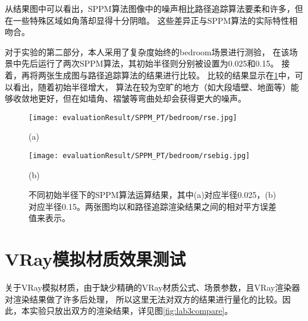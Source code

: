 从结果图中可以看出，SPPM算法图像中的噪声相比路径追踪算法要柔和许多，但在一些特殊区域如角落却显得十分阴暗。
这些差异正与SPPM算法的实际特性相吻合。

对于实验的第二部分，本人采用了复杂度始终的bedroom场景进行测验，
在该场景中先后运行了两次SPPM算法，其初始半径则分别被设置为0.025和0.15。
接着，再将两张生成图与路径追踪算法的结果进行比较。
比较的结果显示在\ref{fig:lab2compare}中，可以看出，随着初始半径增大，
算法在较为空旷的地方（如大段墙壁、地面等）能够收敛地更好，但在如墙角、褶皱等弯曲处却会获得更大的噪声。

\begin{figure}                 %
    \begin{minipage}{0.40\textwidth}  %
      \centerline{\texttt{[image: evaluationResult/SPPM\_PT/bedroom/rse.jpg]}}
      \centerline{(a)}
    \end{minipage}
    \hfill
    \begin{minipage}{0.40\textwidth}  %
      \centerline{\texttt{[image: evaluationResult/SPPM\_PT/bedroom/rsebig.jpg]}}
      \centerline{(b)}
    \end{minipage}    
    \caption{不同初始半径下的SPPM算法运算结果，其中(a)对应半径0.025，(b)对应半径0.15。两张图均以和路径追踪渲染结果之间的相对平方误差值来表示。}
    \label{fig:lab2compare}
\end{figure}

\section{VRay模拟材质效果测试}

关于VRay模拟材质，由于缺少精确的VRay材质公式、场景参数，且VRay渲染器对渲染结果做了许多后处理，
所以这里无法对双方的结果进行量化的比较。因此，本实验只放出双方的渲染结果，详见图\ref{fig:lab3compare}。

